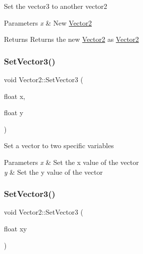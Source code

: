Set the vector3 to another vector2 
\begin{DoxyParams}{Parameters}
{\em x} & New \mbox{\hyperlink{struct_vector2}{Vector2}} \\
\hline
\end{DoxyParams}
\begin{DoxyReturn}{Returns}
Returns the new \mbox{\hyperlink{struct_vector2}{Vector2}} as \mbox{\hyperlink{struct_vector2}{Vector2}} 
\end{DoxyReturn}
\mbox{\label{struct_vector2_a0c002bc16739ff7533526a38e18226a0}} 
\subsubsection{\texorpdfstring{SetVector3()}{SetVector3()}\hspace{0.1cm}{\footnotesize\ttfamily [1/2]}}
{\footnotesize\ttfamily void Vector2\+::\+Set\+Vector3 (\begin{DoxyParamCaption}\item[{float}]{x,  }\item[{float}]{y }\end{DoxyParamCaption})\hspace{0.3cm}{\ttfamily [inline]}}

Set a vector to two specific variables 
\begin{DoxyParams}{Parameters}
{\em x} & Set the x value of the vector \\
\hline
{\em y} & Set the y value of the vector \\
\hline
\end{DoxyParams}
\mbox{\label{struct_vector2_af2880756375df5f0f70aec09efbbc77e}} 
\subsubsection{\texorpdfstring{SetVector3()}{SetVector3()}\hspace{0.1cm}{\footnotesize\ttfamily [2/2]}}
{\footnotesize\ttfamily void Vector2\+::\+Set\+Vector3 (\begin{DoxyParamCaption}\item[{float}]{xy }\end{DoxyParamCaption})\hspace{0.3cm}{\ttfamily [inline]}}

